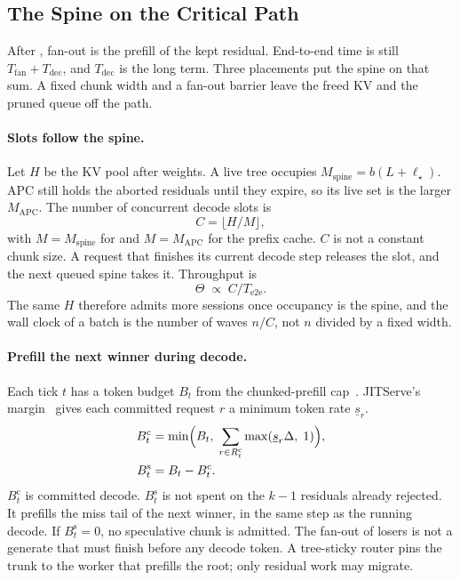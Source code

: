 \subsection{The Spine on the Critical Path}
\label{sec:schedule}
After \app, fan-out is the prefill of the kept residual.
End-to-end time is still $T_{\mathrm{fan}}+T_{\mathrm{dec}}$, and $T_{\mathrm{dec}}$ is the long term.
Three placements put the spine on that sum.
A fixed chunk width and a fan-out barrier leave the freed KV and the pruned queue off the path.

\paragraph{Slots follow the spine.}
Let $H$ be the KV pool after weights.
A live tree occupies $M_{\mathrm{spine}}=b(L+\ell_\star)$.
APC still holds the aborted residuals until they expire, so its live set is the larger $M_{\mathrm{APC}}$.
The number of concurrent decode slots is
\begin{equation}
\label{eq:slots}
C=\bigl\lfloor H/M\bigr\rfloor,
\end{equation}
with $M=M_{\mathrm{spine}}$ for \sys and $M=M_{\mathrm{APC}}$ for the prefix cache.
$C$ is not a constant chunk size.
A request that finishes its current decode step releases the slot, and the next queued spine takes it.
Throughput is
\begin{equation}
\label{eq:theta}
\Theta\;\propto\; C/T_{\mathrm{e2e}}.
\end{equation}
The same $H$ therefore admits more sessions once occupancy is the spine, and the wall clock of a batch is the number of waves $n/C$, not $n$ divided by a fixed width.

\paragraph{Prefill the next winner during decode.}
Each tick $t$ has a token budget $B_t$ from the chunked-prefill cap~\cite{sarathi}.
JITServe's margin~\cite{jitserve} gives each committed request $r$ a minimum token rate $\underline{s}_r$.
\begin{align}
B^{\mathrm{c}}_t &= \min\Bigl(B_t,\; \sum_{r\in R^{\mathrm{c}}_t}\max(\underline{s}_r\Delta,\;1)\Bigr), \label{eq:bc}\\
B^{\mathrm{s}}_t &= B_t-B^{\mathrm{c}}_t. \label{eq:bs}
\end{align}
$B^{\mathrm{c}}_t$ is committed decode.
$B^{\mathrm{s}}_t$ is not spent on the $k{-}1$ residuals \app already rejected.
It prefills the miss tail of the next winner, in the same step as the running decode.
If $B^{\mathrm{s}}_t=0$, no speculative chunk is admitted.
The fan-out of losers is not a generate that must finish before any decode token.
A tree-sticky router pins the trunk to the worker that prefills the root; only residual work may migrate.

